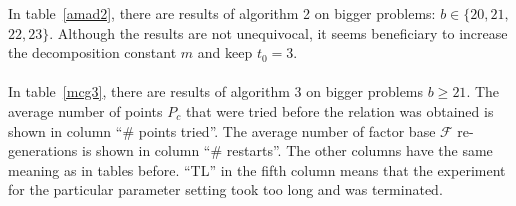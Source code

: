 \documentclass[thesis=M,english]{FITthesis}[2012/10/20]
\theoremstyle{remark}
\theoremstyle{definition}
\begin{document}
\noindent In table~\ref{amad2}, there are results of algorithm 2 on bigger problems: $b \in \{20, 21,$\\ $22, 23\}.$ Although the results are not unequivocal, it seems beneficiary to increase the decomposition constant $m$ and keep $t_0 = 3$. 
\\ \\
\noindent In table~\ref{mcg3}, there are results of algorithm 3 on bigger problems $b\geq 21$. The average number of points $P_c$ that were tried before the relation was obtained is shown in column \enquote{\# points tried}. The average number of factor base $\mathcal{F}$ re-generations is shown in column \enquote{\# restarts}. The other columns have the same meaning as in tables before. \enquote{TL} in the fifth column means that the experiment for the particular parameter setting took too long and was terminated. 
\end{document}
